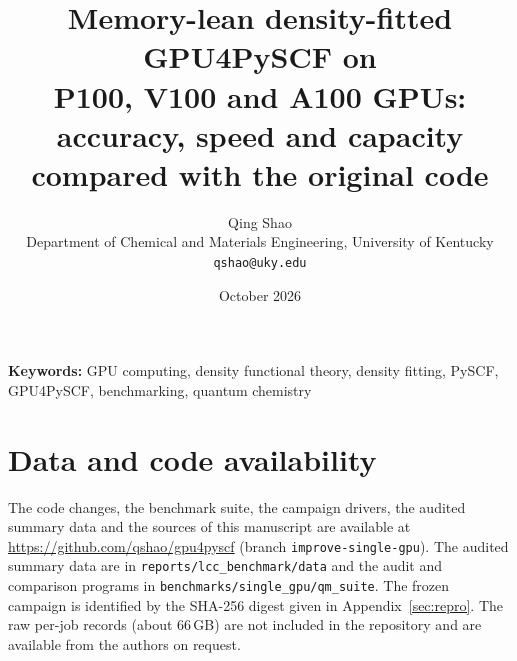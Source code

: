 \documentclass[10pt]{article}
\title{Memory-lean density-fitted GPU4PySCF on\\ P100, V100 and A100 GPUs:\\ accuracy, speed and capacity compared with the original code}
\author{Qing Shao\\\small Department of Chemical and Materials Engineering, University of Kentucky\\\small \texttt{qshao@uky.edu}}
\date{October 2026}
\begin{document}
\maketitle



\noindent\textbf{Keywords:} GPU computing, density functional theory, density fitting, PySCF, GPU4PySCF, benchmarking, quantum chemistry







\section*{Data and code availability}
The code changes, the benchmark suite, the campaign drivers, the audited summary data and the sources of this manuscript are available at \url{https://github.com/qshao/gpu4pyscf} (branch \texttt{improve-single-gpu}). The audited summary data are in \texttt{reports/lcc\_benchmark/data} and the audit and comparison programs in \texttt{benchmarks/single\_gpu/qm\_suite}. The frozen campaign is identified by the SHA-256 digest given in Appendix~\ref{sec:repro}. The raw per-job records (about 66\,GB) are not included in the repository and are available from the authors on request.


\end{document}

